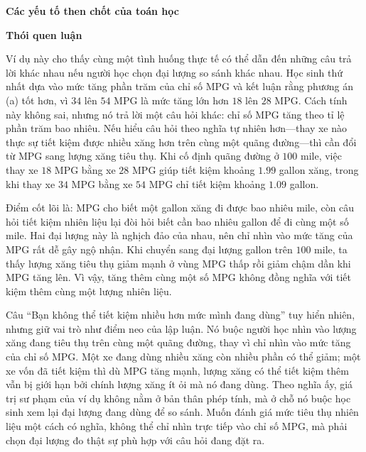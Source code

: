 {    \textbf{Các yếu tố then chốt của toán học}

    \begin{hanglist}
      \vspace{\baselineskip}
      
    \end{hanglist}

    \textbf{Thói quen luận}

    \begin{hanglist}

    \end{hanglist}
  }
  {
    \vspace{.5\baselineskip}
    Ví dụ này cho thấy cùng một tình huống thực tế có thể dẫn đến những câu trả lời khác nhau nếu người học chọn đại lượng so sánh khác nhau. Học sinh thứ nhất dựa vào mức tăng phần trăm của chỉ số MPG và kết luận rằng phương án (a) tốt hơn, vì $34$ lên $54$ MPG là mức tăng lớn hơn $18$ lên $28$ MPG. Cách tính này không sai, nhưng nó trả lời một câu hỏi khác: chỉ số MPG tăng theo tỉ lệ phần trăm bao nhiêu. Nếu hiểu câu hỏi theo nghĩa tự nhiên hơn---thay xe nào thực sự tiết kiệm được nhiều xăng hơn trên cùng một quãng đường---thì cần đổi từ MPG sang lượng xăng tiêu thụ. Khi cố định quãng đường ở $100$ mile, việc thay xe $18$ MPG bằng xe $28$ MPG giúp tiết kiệm khoảng $1.99$ gallon xăng, trong khi thay xe $34$ MPG bằng xe $54$ MPG chỉ tiết kiệm khoảng $1.09$ gallon.

    Điểm cốt lõi là: MPG cho biết một gallon xăng đi được bao nhiêu mile, còn câu hỏi tiết kiệm nhiên liệu lại đòi hỏi biết cần bao nhiêu gallon để đi cùng một số mile. Hai đại lượng này là nghịch đảo của nhau, nên chỉ nhìn vào mức tăng của MPG rất dễ gây ngộ nhận. Khi chuyển sang đại lượng gallon trên $100$ mile, ta thấy lượng xăng tiêu thụ giảm mạnh ở vùng MPG thấp rồi giảm chậm dần khi MPG tăng lên. Vì vậy, tăng thêm cùng một số MPG không đồng nghĩa với tiết kiệm thêm cùng một lượng nhiên liệu.

    Câu ``Bạn không thể tiết kiệm nhiều hơn mức mình đang dùng'' tuy hiển nhiên, nhưng giữ vai trò như điểm neo của lập luận. Nó buộc người học nhìn vào lượng xăng đang tiêu thụ trên cùng một quãng đường, thay vì chỉ nhìn vào mức tăng của chỉ số MPG. Một xe đang dùng nhiều xăng còn nhiều phần có thể giảm; một xe vốn đã tiết kiệm thì dù MPG tăng mạnh, lượng xăng có thể tiết kiệm thêm vẫn bị giới hạn bởi chính lượng xăng ít ỏi mà nó đang dùng. Theo nghĩa ấy, giá trị sư phạm của ví dụ không nằm ở bản thân phép tính, mà ở chỗ nó buộc học sinh xem lại đại lượng đang dùng để so sánh. Muốn đánh giá mức tiêu thụ nhiên liệu một cách có nghĩa, không thể chỉ nhìn trực tiếp vào chỉ số MPG, mà phải chọn đại lượng đo thật sự phù hợp với câu hỏi đang đặt ra.
  }

